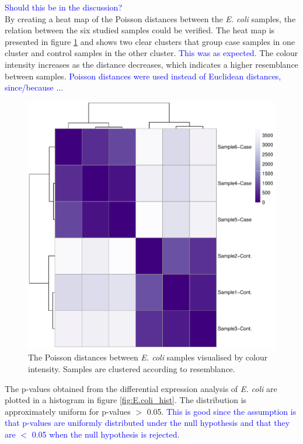 
\textcolor{blue}{Should this be in the discussion?}\\
By creating a heat map of the Poisson distances between the \textit{E. coli} samples, the relation between the six studied samples could be verified. The heat map is presented in figure \ref{fig:E.coli_pois} and shows two clear clusters that group case samples in one cluster and control samples in the other cluster.  \textcolor{blue}{This was as expected.} The colour intensity increases as the distance decreases, which indicates a higher resemblance between samples. \textcolor{blue}{Poisson distances were used instead of Euclidean distances, since/because ...}

\begin{figure}[ht]
    \centering
    \includegraphics[scale=0.6]{Figures/Pois_dist_heat_E_coli.pdf}
    \caption{The Poisson distances between \textit{E. coli} samples visualised by colour intensity. Samples are clustered according to resemblance.}
    \label{fig:E.coli_pois}
\end{figure}
 
The p-values obtained from the differential expression analysis of \textit{E. coli} are plotted in a histogram in figure \ref{fig:E.coli_hist}. The distribution is approximately uniform for p-values $>$ 0.05. \textcolor{blue}{This is good since the assumption is that p-values are uniformly distributed under the null hypothesis and that they are $<$ 0.05 when the null hypothesis is rejected.}

